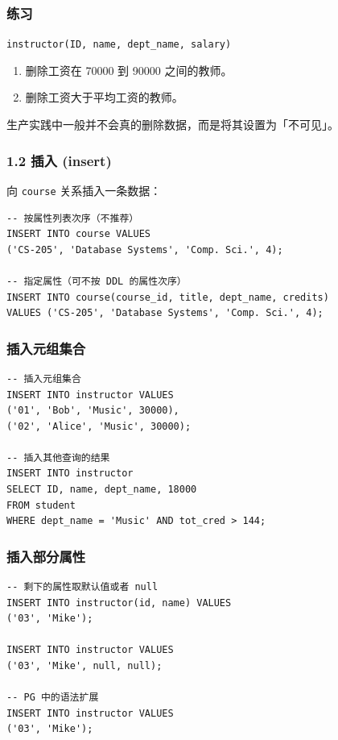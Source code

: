 \documentclass[aspectratio=169, 14pt]{beamer}
\begin{document}
\begin{frame}
	\frametitle{练习 {\large {}} }
	\texttt{instructor(ID, name, dept\_name, salary)}

	\begin{enumerate}
		\item 删除工资在 70000 到 90000 之间的教师。
		\item 删除工资大于平均工资的教师。
	\end{enumerate}

\end{frame}

{
\begin{frame}[standout]
	生产实践中一般并不会真的删除数据，而是将其设置为「不可见」。
\end{frame}
}

\begin{frame}[fragile]
	\frametitle{1.2 插入 (insert)}
	向 \texttt{course} 关系插入一条数据：

	\begin{verbatim}
-- 按属性列表次序（不推荐）
INSERT INTO course VALUES 
('CS-205', 'Database Systems', 'Comp. Sci.', 4);

-- 指定属性（可不按 DDL 的属性次序）
INSERT INTO course(course_id, title, dept_name, credits)
VALUES ('CS-205', 'Database Systems', 'Comp. Sci.', 4);
\end{verbatim}

\end{frame}

\begin{frame}[fragile]
	\frametitle{插入元组集合}
	\begin{verbatim}
-- 插入元组集合
INSERT INTO instructor VALUES 
('01', 'Bob', 'Music', 30000),
('02', 'Alice', 'Music', 30000);

-- 插入其他查询的结果
INSERT INTO instructor
SELECT ID, name, dept_name, 18000
FROM student
WHERE dept_name = 'Music' AND tot_cred > 144;
    \end{verbatim}

\end{frame}

\begin{frame}[fragile]
	\frametitle{插入部分属性}
	\begin{verbatim}
-- 剩下的属性取默认值或者 null
INSERT INTO instructor(id, name) VALUES 
('03', 'Mike');

INSERT INTO instructor VALUES 
('03', 'Mike', null, null);

-- PG 中的语法扩展
INSERT INTO instructor VALUES 
('03', 'Mike');
    \end{verbatim}
\end{frame}
\end{document}
